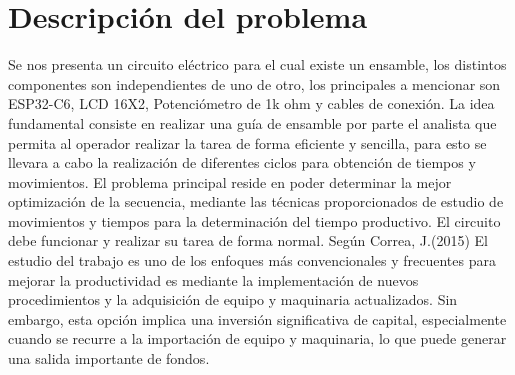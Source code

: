     \section{Descripción del problema}
    Se nos presenta un circuito eléctrico para el cual existe un ensamble, los distintos componentes son independientes de uno de otro, los principales a mencionar son ESP32-C6, LCD 16X2, Potenciómetro de 1k ohm y cables de conexión.
    La idea fundamental consiste en realizar una guía de ensamble por parte el analista que permita al operador realizar la tarea de forma eficiente y sencilla, para esto se llevara a cabo la realización de diferentes ciclos para obtención de tiempos y movimientos.
    El problema principal reside en poder determinar la mejor optimización de la secuencia, mediante las técnicas proporcionados de estudio de movimientos y tiempos para la determinación del tiempo productivo. El circuito debe funcionar y realizar su tarea de forma normal.
    Según Correa, J.(2015) El estudio del trabajo es uno de los enfoques más convencionales y frecuentes para mejorar la productividad es mediante la implementación de nuevos procedimientos y la adquisición de equipo y maquinaria actualizados. Sin embargo, esta opción implica una inversión significativa de capital, especialmente cuando se recurre a la importación de equipo y maquinaria, lo que puede generar una salida importante de fondos.\cite{REF6}
    
